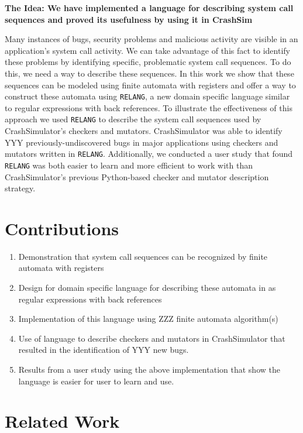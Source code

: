\documentclass{article}
\begin{document}
\textbf{The Idea: We have implemented a language for describing system
call sequences and proved its usefulness by using it in CrashSim}\break

Many instances of bugs, security problems and malicious activity are
visible in an application's system call activity.  We can take advantage of
this fact to identify these problems by identifying specific,
problematic system call sequences.  To do this, we need a way to describe
these sequences.  In this work we show that these sequences can be modeled
using finite automata with registers and offer a way to construct these
automata using {\tt RELANG}, a new domain specific
language similar to regular expressions with back
references.  To illustrate the effectiveness of this approach we
used {\tt RELANG} to describe the system call sequences used by
CrashSimulator's checkers and mutators.  CrashSimulator was able to
identify YYY previously-undiscovered bugs in major applications using
checkers and mutators written in {\tt RELANG}.  Additionally, we conducted a
user study that found {\tt RELANG} was both easier to learn and more
efficient to work with than CrashSimulator's previous Python-based checker
and mutator description strategy.


\section{Contributions}
\begin{enumerate}
\item{Demonstration that system call sequences can be recognized by finite
    automata with registers}
\item{Design for domain specific language for describing these automata in
    as regular expressions with back references}
\item{Implementation of this language using ZZZ finite automata
    algorithm(s)}
\item{Use of language to describe checkers and mutators in CrashSimulator
    that resulted in the identification of YYY new bugs.}
\item{Results from a user study using the above implementation that show the
language is easier for user to learn and use.}
\end{enumerate}

\section{Related Work}
\end{document}
